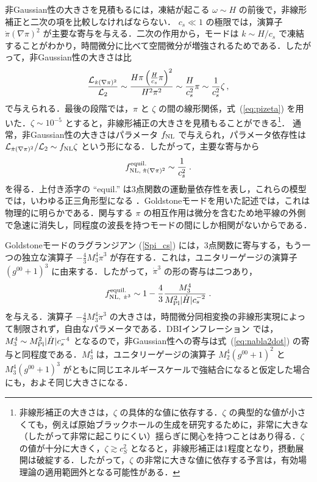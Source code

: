 非Gaussian性の大きさを見積もるには，凍結が起こる $\omega \sim H$ の前後で，非線形補正と二次の項を比較しなければならない．
$c_s\ll 1$ の極限では，演算子 $\dot\pi(\nabla{\pi})^2$ が主要な寄与を与える．二次の作用から，モードは $k
\sim H/c_s$ で凍結することがわかり，時間微分に比べて空間微分が増強されるためである．したがって，非Gaussian性の大きさは比
\begin{equation}
\frac{{\cal L}_{\dot\pi(\nabla \pi)^2}}{{\cal L}_{2}}\sim \frac{H
\pi \left(\frac{H}{c_s} \pi\right)^2}{H^2 \pi^2} \sim \frac{H}{c^2_s}
\pi \sim \frac{1}{c^2_s} \zeta \, ,
\end{equation}
で与えられる．最後の段階では，$\pi$ と $\zeta$ の間の線形関係，式~(\ref{eq:pizeta}) を用いた．$\zeta \sim
10^{-5}$ とすると，非線形補正の大きさを見積もることができる\footnote{非線形補正の大きさは，$\zeta$ の具体的な値に依存する．$\zeta$ の典型的な値が小さくても，例えば原始ブラックホールの生成を研究するために，非常に大きな（したがって非常に起こりにくい）揺らぎに関心を持つことはあり得る．$\zeta$ の値が十分に大きく，$\zeta \gtrsim c_S^2$ となると，非線形補正は1程度となり，摂動展開は破綻する．したがって，$\zeta$ の非常に大きな値に依存する予言は，有効場理論の適用範囲外となる可能性がある．}．
通常，非Gaussian性の大きさはパラメータ $f_{\rm
NL}$ で与えられ，パラメータ依存性は ${\cal L}_{\dot\pi(\nabla
\pi)^2}/{\cal L}_2\sim f_{\rm NL} \zeta$ という形になる．したがって，主要な寄与から
\begin{equation}
\label{eq:nabla2dot}
f^{\rm equil.}_{\rm NL, \;\dot\pi(\nabla\pi)^2}\sim \frac{1}{c^2_s} \;.
\end{equation}
を得る．上付き添字の ``equil.'' は3点関数の運動量依存性を表し，これらの模型では，いわゆる正三角形型になる \cite{Babich:2004gb}．Goldstoneモードを用いた記述では，これは物理的に明らかである．関与する $\pi$ の相互作用は微分を含むため地平線の外側で急速に消失し，同程度の波長を持つモードの間にしか相関がないからである．

Goldstoneモードのラグランジアン (\ref{Spi_cs}) には，3点関数に寄与する，もう一つの独立な演算子 $-\frac43 M_3^4 \dot\pi^3$ が存在する．これは，ユニタリーゲージの演算子 $(g^{00}+1)^3$ に由来する．したがって，$\dot\pi^3$ の形の寄与は二つあり，
\begin{equation}\label{fnldotpicube}
f^{\rm equil.}_{\rm NL,\ \dot\pi^3}\sim 1-\frac{4}{3}
\frac{M_3^4}{M_{\rm Pl}^2 |\dot H| c_s^{-2}} \;.
\end{equation}
を与える．演算子 $-\frac43 M_3^4 \dot\pi^3$ の大きさは，時間微分同相変換の非線形実現によって制限されず，自由なパラメータである．DBIインフレーション \cite{Alishahiha:2004eh} では，$M_3^4 \sim M_{\rm Pl}^2 |\dot H| c_s^{-4}$ となるので，非Gaussian性への寄与は式~(\ref{eq:nabla2dot}) の寄与と同程度である．$M_3^4$ は，ユニタリーゲージの演算子 $M_2^4 (g^{00}+1)^2$ と $M_3^4 (g^{00}+1)^3$ がともに同じエネルギースケールで強結合になると仮定した場合にも，およそ同じ大きさになる．

